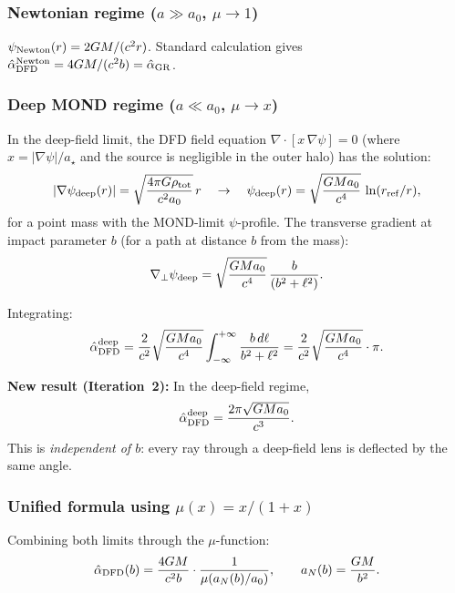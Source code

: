 \documentclass[11pt]{article}
\newcommand{\mufd}{\mu}
\newcommand{\astar}{a_\star}
\begin{document}
\subsubsection{Newtonian regime ($a \gg a_0$, $\mufd \to 1$)}

$\psi_{\rm Newton}(r) = 2GM/(c^2 r)$.  Standard calculation gives
$\hat\alpha_{\rm DFD}^{\rm Newton} = 4GM/(c^2 b) = \hat\alpha_{\rm GR}$.

\subsubsection{Deep MOND regime ($a \ll a_0$, $\mufd \to x$)}

In the deep-field limit, the DFD field equation $\nabla\cdot[x\,\nabla\psi] = 0$
(where $x = |\nabla\psi|/\astar$ and the source is negligible in the outer
halo) has the solution:
\begin{equation}
  |\nabla\psi_{\rm deep}(r)| = \sqrt{\frac{4\pi G\rho_{\rm tot}}{c^2 a_0}}\,r
  \quad \to \quad \psi_{\rm deep}(r) = \sqrt{\frac{GM a_0}{c^4}}\,\ln(r_{\rm ref}/r),
\end{equation}
for a point mass with the MOND-limit $\psi$-profile.  The transverse
gradient at impact parameter $b$ (for a path at distance $b$ from the
mass):
\begin{equation}
  \nabla_\perp\psi_{\rm deep} = \sqrt{\frac{GMa_0}{c^4}}\,\frac{b}{(b^2 + \ell^2)}.
\end{equation}

Integrating:
\begin{equation}
  \hat\alpha_{\rm DFD}^{\rm deep}
  = \frac{2}{c^2}\sqrt{\frac{GMa_0}{c^4}}
  \int_{-\infty}^{+\infty}\frac{b\,d\ell}{b^2 + \ell^2}
  = \frac{2}{c^2}\sqrt{\frac{GMa_0}{c^4}}\cdot\pi.
\end{equation}

\textbf{New result (Iteration~2):} In the deep-field regime,
\begin{equation}\label{eq:deep-lensing}
  \hat\alpha_{\rm DFD}^{\rm deep} = \frac{2\pi\sqrt{GMa_0}}{c^3}.
\end{equation}
This is \emph{independent of $b$}: every ray through a deep-field lens
is deflected by the same angle.

\subsubsection{Unified formula using $\mu(x) = x/(1+x)$}

Combining both limits through the $\mu$-function:
\begin{equation}
  \hat\alpha_{\rm DFD}(b) = \frac{4GM}{c^2 b}\cdot\frac{1}{\mu(a_N(b)/a_0)},
  \qquad a_N(b) = \frac{GM}{b^2}.
\end{equation}
\end{document}
